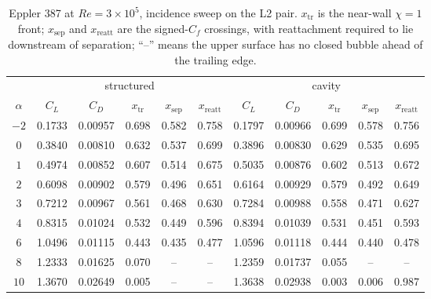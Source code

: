 \begin{table}[H]
  \centering\small
  \caption{Eppler 387 at $Re=3\times10^5$, incidence sweep on the L2 pair. $x_\mathrm{tr}$ is the near-wall $\chi\!=\!1$ front; $x_\mathrm{sep}$ and $x_\mathrm{reatt}$ are the signed-$C_f$ crossings, with reattachment required to lie downstream of separation; ``--'' means the upper surface has no closed bubble ahead of the trailing edge.}
  \label{t:extepp300k}
  \begin{tabular}{c ccccc ccccc}
    \toprule
    & \multicolumn{5}{c}{structured} & \multicolumn{5}{c}{cavity} \\
    \cmidrule(lr){2-6}\cmidrule(lr){7-11}
    $\alpha$ & $C_L$ & $C_D$ & $x_\mathrm{tr}$ & $x_\mathrm{sep}$ & $x_\mathrm{reatt}$
             & $C_L$ & $C_D$ & $x_\mathrm{tr}$ & $x_\mathrm{sep}$ & $x_\mathrm{reatt}$ \\
    \midrule
    $-2$ & 0.1733 & 0.00957 & 0.698 & 0.582 & 0.758 & 0.1797 & 0.00966 & 0.699 & 0.578 & 0.756 \\
    $0$ & 0.3840 & 0.00810 & 0.632 & 0.537 & 0.699 & 0.3896 & 0.00830 & 0.629 & 0.535 & 0.695 \\
    $1$ & 0.4974 & 0.00852 & 0.607 & 0.514 & 0.675 & 0.5035 & 0.00876 & 0.602 & 0.513 & 0.672 \\
    $2$ & 0.6098 & 0.00902 & 0.579 & 0.496 & 0.651 & 0.6164 & 0.00929 & 0.579 & 0.492 & 0.649 \\
    $3$ & 0.7212 & 0.00967 & 0.561 & 0.468 & 0.630 & 0.7284 & 0.00988 & 0.558 & 0.471 & 0.627 \\
    $4$ & 0.8315 & 0.01024 & 0.532 & 0.449 & 0.596 & 0.8394 & 0.01039 & 0.531 & 0.451 & 0.593 \\
    $6$ & 1.0496 & 0.01115 & 0.443 & 0.435 & 0.477 & 1.0596 & 0.01118 & 0.444 & 0.440 & 0.478 \\
    $8$ & 1.2333 & 0.01625 & 0.070 & -- & -- & 1.2359 & 0.01737 & 0.055 & -- & -- \\
    $10$ & 1.3670 & 0.02649 & 0.005 & -- & -- & 1.3638 & 0.02938 & 0.003 & 0.006 & 0.987 \\
    \bottomrule
  \end{tabular}
\end{table}
